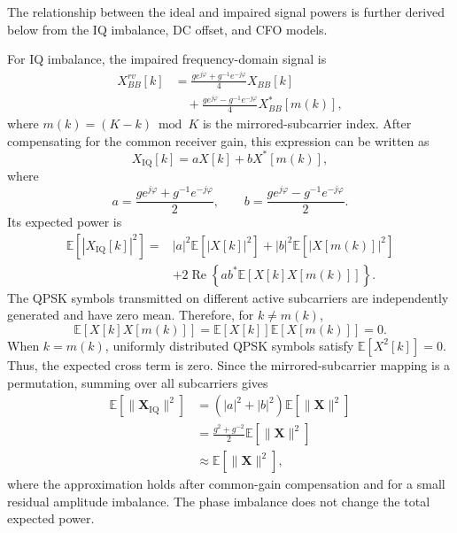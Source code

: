 \documentclass[onecolumn,11pt]{article}
\begin{document}
{The relationship between the ideal and impaired signal powers is further derived below from the IQ imbalance, DC offset, and CFO models.

For IQ imbalance, the impaired frequency-domain signal is
\begin{equation}
\begin{aligned}
X_{BB}^{rv}[k]
&=
\frac{g e^{j\varphi}+g^{-1}e^{-j\varphi}}{4}X_{BB}[k]
\\
&\quad+
\frac{g e^{j\varphi}-g^{-1}e^{-j\varphi}}{4}
X_{BB}^*[m(k)],
\end{aligned}
\end{equation}
where $m(k)=(K-k)\bmod K$ is the mirrored-subcarrier index. After compensating for the common receiver gain, this expression can be written as
\begin{equation}
X_{\mathrm{IQ}}[k]
=
aX[k]+bX^*[m(k)],
\end{equation}
where
\begin{equation}
a=\frac{g e^{j\varphi}+g^{-1}e^{-j\varphi}}{2},
\qquad
b=\frac{g e^{j\varphi}-g^{-1}e^{-j\varphi}}{2}.
\end{equation}
Its expected power is
\begin{equation}
\begin{aligned}
\mathbb{E}[|X_{\mathrm{IQ}}[k]|^2]
={}&
|a|^2\mathbb{E}[|X[k]|^2]
+
|b|^2\mathbb{E}[|X[m(k)]|^2]
\\
&+
2\operatorname{Re}
\left\{
ab^*\mathbb{E}[X[k]X[m(k)]]
\right\}.
\end{aligned}
\end{equation}
The QPSK symbols transmitted on different active subcarriers are independently generated and have zero mean. Therefore, for $k\neq m(k)$,
\begin{equation}
\mathbb{E}[X[k]X[m(k)]]
=
\mathbb{E}[X[k]]
\mathbb{E}[X[m(k)]]
=
0.
\end{equation}
When $k=m(k)$, uniformly distributed QPSK symbols satisfy $\mathbb{E}[X^2[k]]=0$. Thus, the expected cross term is zero. Since the mirrored-subcarrier mapping is a permutation, summing over all subcarriers gives
\begin{equation}
\begin{aligned}
\mathbb{E}\!\left[\|\boldsymbol{X}_{\mathrm{IQ}}\|^2\right]
&=
\left(|a|^2+|b|^2\right)
\mathbb{E}\!\left[\|\boldsymbol{X}\|^2\right]
\\
&=
\frac{g^2+g^{-2}}{2}
\mathbb{E}\!\left[\|\boldsymbol{X}\|^2\right]
\\
&\approx
\mathbb{E}\!\left[\|\boldsymbol{X}\|^2\right],
\end{aligned}
\end{equation}
where the approximation holds after common-gain compensation and for a small residual amplitude imbalance. The phase imbalance does not change the total expected power.

}
\end{document}
